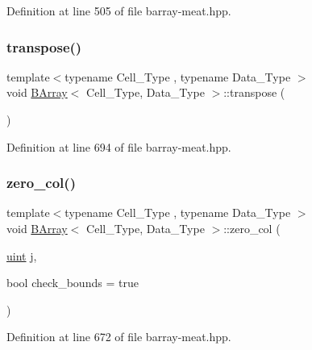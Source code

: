 Definition at line 505 of file barray-\/meat.\+hpp.

\mbox{\label{class_b_array_a0284f7f2148b7c1b474ebe01f6548b98}} 
\subsubsection{\texorpdfstring{transpose()}{transpose()}}
{\footnotesize\ttfamily template$<$typename Cell\+\_\+\+Type , typename Data\+\_\+\+Type $>$ \\
void \hyperlink{class_b_array}{B\+Array}$<$ Cell\+\_\+\+Type, Data\+\_\+\+Type $>$\+::transpose (\begin{DoxyParamCaption}{ }\end{DoxyParamCaption})\hspace{0.3cm}{\ttfamily [inline]}}



Definition at line 694 of file barray-\/meat.\+hpp.

\mbox{\label{class_b_array_a0fa473027d00ec53ed08eaea03ac3ef7}} 
\subsubsection{\texorpdfstring{zero\+\_\+col()}{zero\_col()}}
{\footnotesize\ttfamily template$<$typename Cell\+\_\+\+Type , typename Data\+\_\+\+Type $>$ \\
void \hyperlink{class_b_array}{B\+Array}$<$ Cell\+\_\+\+Type, Data\+\_\+\+Type $>$\+::zero\+\_\+col (\begin{DoxyParamCaption}\item[{\hyperlink{typedefs_8hpp_a91ad9478d81a7aaf2593e8d9c3d06a14}{uint}}]{j,  }\item[{bool}]{check\+\_\+bounds = {\ttfamily true} }\end{DoxyParamCaption})\hspace{0.3cm}{\ttfamily [inline]}}



Definition at line 672 of file barray-\/meat.\+hpp.

\mbox{\label{class_b_array_a411085fcb7530669c72d9847340f1bac}} 
